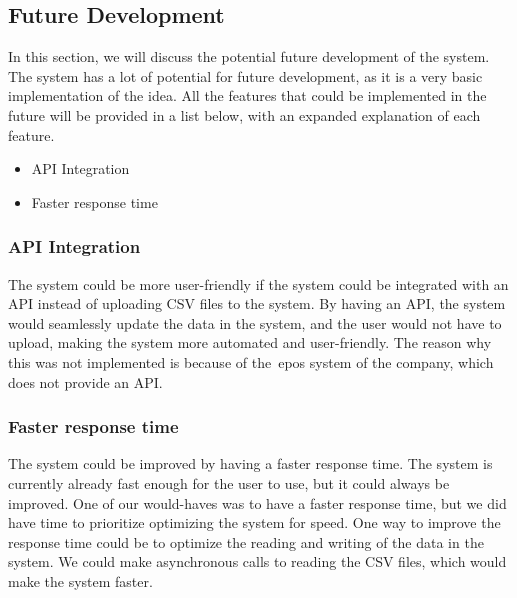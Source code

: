 \subsection{Future Development}\label{subsec:future-development}

In this section, we will discuss the potential future development of the system.
The system has a lot of potential for future development, as it is a very basic implementation of the idea.
All the features that could be implemented in the future will be provided in a list below, with an expanded
explanation of each feature.

\begin{itemize}
    \item API Integration
    \item Faster response time
\end{itemize}

\subsubsection{API Integration}

The system could be more user-friendly if the system could be integrated with an API instead of uploading CSV files
to the system.
By having an API, the system would seamlessly update the data in the system, and the user would not have to upload,
making the system more automated and user-friendly.
The reason why this was not implemented is because of the~\acrshort{epos} system of the company, which does not provide
an API\@.

\subsubsection{Faster response time}

The system could be improved by having a faster response time.
The system is currently already fast enough for the user to use, but it could always be improved.
One of our would-haves was to have a faster response time, but we did have time to prioritize optimizing the system
for speed.
One way to improve the response time could be to optimize the reading and writing of the data in the system.
We could make asynchronous calls to reading the CSV files, which would make the system faster.

